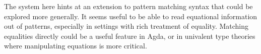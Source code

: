 
The system here hints at an extension to pattern matching syntax that could be explored more generally. 
It seems useful to be able to read equational information out of patterns, especially in settings with rich treatment of equality.
Matching equalities directly could be a useful feature in Agda, or in univalent type theories where manipulating equations is more critical.%

